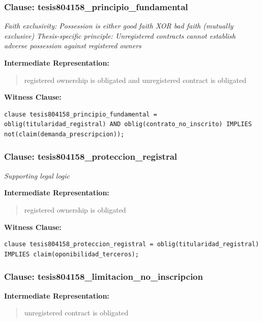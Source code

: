 \documentclass[11pt,a4paper]{article}
\begin{document}
\subsubsection{Clause: tesis804158\_principio\_fundamental}

\textit{Faith exclusivity: Possession is either good faith XOR bad faith (mutually exclusive) Thesis-specific principle: Unregistered contracts cannot establish adverse possession against registered owners}

\textbf{Intermediate Representation:}

\begin{quote}
registered ownership is obligated and unregistered contract is obligated
\end{quote}

\textbf{Witness Clause:}

\begin{lstlisting}[style=witnessstyle, language=Witness]
clause tesis804158_principio_fundamental = oblig(titularidad_registral) AND oblig(contrato_no_inscrito) IMPLIES not(claim(demanda_prescripcion));
\end{lstlisting}

\subsubsection{Clause: tesis804158\_proteccion\_registral}

\textit{Supporting legal logic}

\textbf{Intermediate Representation:}

\begin{quote}
registered ownership is obligated
\end{quote}

\textbf{Witness Clause:}

\begin{lstlisting}[style=witnessstyle, language=Witness]
clause tesis804158_proteccion_registral = oblig(titularidad_registral) IMPLIES claim(oponibilidad_terceros);
\end{lstlisting}

\subsubsection{Clause: tesis804158\_limitacion\_no\_inscripcion}

\textbf{Intermediate Representation:}

\begin{quote}
unregistered contract is obligated
\end{quote}
\end{document}
